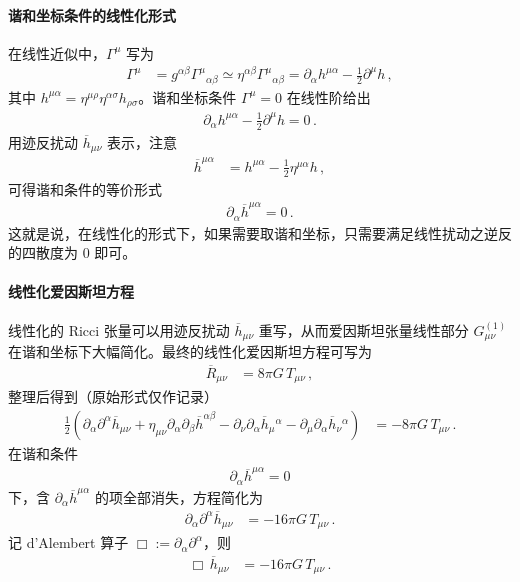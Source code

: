 \paragraph{谐和坐标条件的线性化形式}

在线性近似中，$\Gamma^{\mu}$ 写为
\begin{align}
\Gamma^{\mu}
&=
g^{\alpha\beta}\Gamma^{\mu}{}_{\alpha\beta}
\simeq
\eta^{\alpha\beta}\Gamma^{\mu}{}_{\alpha\beta}
=
\partial_{\alpha}h^{\mu\alpha}
-
\frac{1}{2}\partial^{\mu}h\,,
\end{align}
其中 $h^{\mu\alpha}=\eta^{\mu\rho}\eta^{\alpha\sigma}h_{\rho\sigma}$。谐和坐标条件 $\Gamma^{\mu}=0$ 在线性阶给出
\begin{align}
\partial_{\alpha}h^{\mu\alpha}
-
\frac{1}{2}\partial^{\mu}h
=0\,.
\end{align}
用迹反扰动 $\overline{h}_{\mu\nu}$ 表示，注意
\begin{align}
\overline{h}^{\mu\alpha}
&=
h^{\mu\alpha}
-
\frac{1}{2}\eta^{\mu\alpha}h\,,
\end{align}
可得谐和条件的等价形式
\begin{align}
\partial_{\alpha}\overline{h}^{\mu\alpha} = 0\,.
\end{align}
这就是说，在线性化的形式下，如果需要取谐和坐标，只需要满足线性扰动之逆反的四散度为 0 即可。

\paragraph{线性化爱因斯坦方程}

线性化的 Ricci 张量可以用迹反扰动 $\overline{h}_{\mu\nu}$ 重写，从而爱因斯坦张量线性部分 $G^{(1)}_{\mu\nu}$ 在谐和坐标下大幅简化。最终的线性化爱因斯坦方程可写为
\begin{align}
\overline{R}_{\mu\nu}
&=
8\pi G\,T_{\mu\nu}\,,
\end{align}
整理后得到（原始形式仅作记录）
\begin{align}
\frac{1}{2}
\left(
  \partial_{\alpha}\partial^{\alpha}\overline{h}_{\mu\nu}
  +
  \eta_{\mu\nu}\partial_{\alpha}\partial_{\beta}\overline{h}^{\alpha\beta}
  -
  \partial_{\nu}\partial_{\alpha}\overline{h}_{\mu}{}^{\alpha}
  -
  \partial_{\mu}\partial_{\alpha}\overline{h}_{\nu}{}^{\alpha}
\right)
&=
-8\pi G\,T_{\mu\nu}\,.
\end{align}
在谐和条件
\begin{align}
\partial_{\alpha}\overline{h}^{\mu\alpha}=0
\end{align}
下，含 $\partial_{\alpha}\overline{h}^{\mu\alpha}$ 的项全部消失，方程简化为
\begin{align}
\partial_{\alpha}\partial^{\alpha}\overline{h}_{\mu\nu}
&=
-16\pi G\,T_{\mu\nu}\,.
\end{align}
记 d'Alembert 算子 $\Box := \partial_{\alpha}\partial^{\alpha}$，则
\begin{align}
\Box\,\overline{h}_{\mu\nu}
&=
-16\pi G\,T_{\mu\nu}\,.
\end{align}

